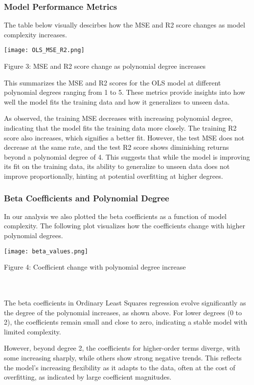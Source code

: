 \documentclass{article}
\begin{document}
\begin{enumerate}
\subsubsection{Model Performance Metrics}
The table below visually descirbes how the MSE and R2 score changes as model complexity increases. 

   
    \begin{center}
    \texttt{[image: OLS\_MSE\_R2.png]}
    \caption{Figure 3: MSE and R2 score change as polynomial degree increases}
    \label{fig:enter-label}
    \end{center}
    

This summarizes the MSE and R2 scores for the OLS model at different polynomial degrees ranging from 1 to 5. These metrics provide insights into how well the model fits the training data and how it generalizes to unseen data.


As observed, the training MSE decreases with increasing polynomial degree, indicating that the model fits the training data more closely. The training R2 score also increases, which signifies a better fit. However, the test MSE does not decrease at the same rate, and the test R2 score shows diminishing returns beyond a polynomial degree of 4. This suggests that while the model is improving its fit on the training data, its ability to generalize to unseen data does not improve proportionally, hinting at potential overfitting at higher degrees.

\subsubsection{Beta Coefficients and Polynomial Degree}
In our analysis we also plotted the beta coefficients as a function of model complexity. The following plot visualizes how the coefficients change with higher polynomial degrees.

    \texttt{[image: beta\_values.png]}
    \caption{Figure 4: Coefficient change with polynomial degree increase}
    \label{fig:enter-label}\\\\


The beta coefficients in Ordinary Least Squares regression evolve significantly as the degree of the polynomial increases, as shown above. For lower degrees (0 to 2), the coefficients remain small and close to zero, indicating a stable model with limited complexity.

However, beyond degree 2, the coefficients for higher-order terms diverge, with some increasing sharply, while others show strong negative trends. This reflects the model's increasing flexibility as it adapts to the data, often at the cost of overfitting, as indicated by large coefficient magnitudes.


\end{enumerate}
\end{document}
